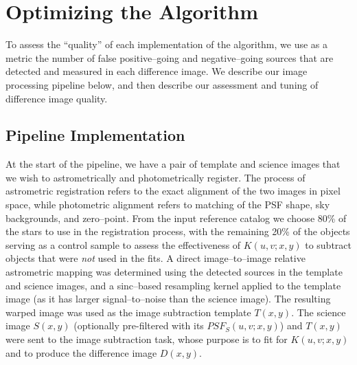 \documentclass[floatfix, apj]{emulateapj}
\begin{document}
\section{Optimizing the Algorithm}

To assess the ``quality'' of each implementation of the algorithm, we use as a metric the number of false positive--going and negative--going sources that are detected and measured in each difference image.  We describe our image processing pipeline below, and then describe our assessment and tuning of difference image quality.


\subsection{Pipeline Implementation}

At the start of the pipeline, we have a pair of template and science images that we wish to astrometrically and photometrically register.
The process of astrometric registration refers to the exact alignment of the two images in pixel space, while photometric alignment refers to matching of the PSF shape, sky backgrounds, and zero--point.
From the input reference catalog we choose 80\% of the stars to use in the registration process, with the remaining 20\% of the objects serving as a control sample to assess
the effectiveness of $K(u,v;x,y)$ to subtract objects that were {\it not} used in the fits.
A direct image--to--image relative astrometric mapping was determined using the detected sources in the template and science images, and a sinc--based resampling kernel applied to the template image (as it has larger signal--to--noise than the science image).
The resulting warped image was used as the image subtraction template $T(x,y)$.
The science image $S(x,y)$ (optionally pre-filtered with its $PSF_S(u,v;x,y)$) and $T(x,y)$ were sent to the image subtraction task, whose purpose is to fit for $K(u,v;x,y)$ and to produce the difference image $D(x,y)$.
\end{document}
